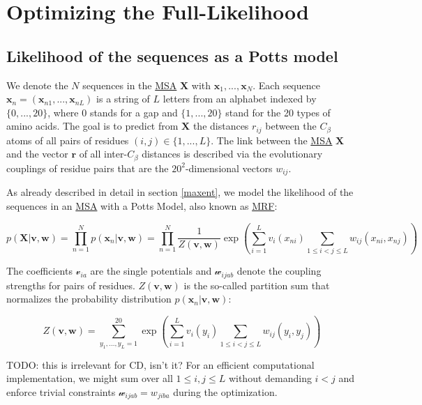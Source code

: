 \documentclass[12pt,a4paper,twoside]{book}
\newcommand{\Cb}{C_\beta}
\newcommand{\seq}{\mathbf{x}}
\renewcommand{\v}{\mathbf{v}}
\newcommand{\via}{\mathcal{v}_{ia}}
\newcommand{\w}{\mathbf{w}}
\newcommand{\wijab}{\mathcal{w}_{ijab}}
\newcommand{\X}{\mathbf{X}}
\theoremstyle{definition}
\theoremstyle{definition}
\theoremstyle{remark}
\begin{document}
\chapter{Optimizing the
Full-Likelihood}\label{optimizing-full-likelihood}

\section{Likelihood of the sequences as a Potts
model}\label{likelihood-of-the-sequences-as-a-potts-model}

We denote the \(N\) sequences in the \protect\hyperlink{abbrev}{MSA}
\(\X\) with \({\seq_1, ..., \seq_N}\). Each sequence
\(\seq_n = (\seq_{n1}, ..., \seq_{nL})\) is a string of \(L\) letters
from an alphabet indexed by \(\{0, ..., 20\}\), where 0 stands for a gap
and \(\{1, ... , 20\}\) stand for the 20 types of amino acids. The goal
is to predict from \(\X\) the distances \(r_{ij}\) between the \(\Cb\)
atoms of all pairs of residues \((i, j) \in \{1, ..., L\}\). The link
between the \protect\hyperlink{abbrev}{MSA} \(\X\) and the vector
\(\mathbf{r}\) of all inter-\(\Cb\) distances is described via the
evolutionary couplings of residue pairs that are the
\(20^2\)-dimensional vectors \(w_{ij}\).

As already described in detail in section \ref{maxent}, we model the
likelihood of the sequences in an \protect\hyperlink{abbrev}{MSA} with a
Potts Model, also known as \protect\hyperlink{abbrev}{MRF}:

\begin{equation}
    p(\X | \v, \w) = \prod_{n=1}^N p(\seq_n | \v, \w) = \prod_{n=1}^N \frac{1}{Z(\v, \w)} \exp \left( \sum_{i=1}^L v_i(x_{ni}) \sum_{1 \leq i < j \leq L} w_{ij}(x_{ni}, x_{nj}) \right)
\end{equation}

The coefficients \(\via\) are the single potentials and \(\wijab\)
denote the coupling strengths for pairs of residues. \(Z(\v, \w)\) is
the so-called partition sum that normalizes the probability distribution
\(p(\seq_n |\v, \w)\):

\begin{equation}
  Z(\v, \w) = \sum_{y_1, ..., y_L = 1}^{20} \exp \left( \sum_{i=1}^L v_i(y_i) \sum_{1 \leq i < j \leq L} w_{ij}(y_i, y_j)  \right)
\end{equation}

TODO: this is irrelevant for CD, isn't it? For an efficient
computational implementation, we might sum over all \(1 \le i, j \le L\)
without demanding \(i < j\) and enforce trivial constraints
\(\wijab = w_{jiba}\) during the optimization.
\end{document}
